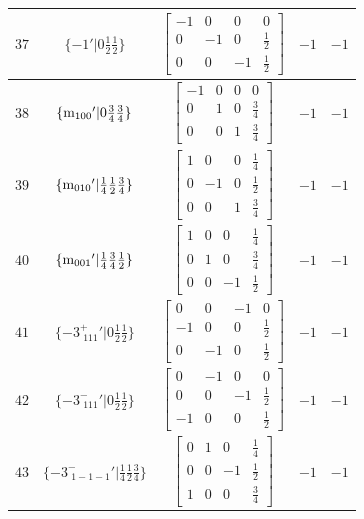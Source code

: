 \documentclass[fleqn,8pt]{jsarticle}
\begin{document}
\begin{longtable}{ccccc}
$ 37 $ & $ \{-1{}'|0 \frac{1}{2} \frac{1}{2}\} $ & $ \begin{bmatrix} -1 & 0 & 0 & 0 \\ 0 & -1 & 0 & \frac{1}{2} \\ 0 & 0 & -1 & \frac{1}{2} \end{bmatrix} $ & $ -1 $ & $ -1 $ \\ \hline
$ 38 $ & $ \{{\rm m}_{100}{}'|0 \frac{3}{4} \frac{3}{4}\} $ & $ \begin{bmatrix} -1 & 0 & 0 & 0 \\ 0 & 1 & 0 & \frac{3}{4} \\ 0 & 0 & 1 & \frac{3}{4} \end{bmatrix} $ & $ -1 $ & $ -1 $ \\ \hline
$ 39 $ & $ \{{\rm m}_{010}{}'|\frac{1}{4} \frac{1}{2} \frac{3}{4}\} $ & $ \begin{bmatrix} 1 & 0 & 0 & \frac{1}{4} \\ 0 & -1 & 0 & \frac{1}{2} \\ 0 & 0 & 1 & \frac{3}{4} \end{bmatrix} $ & $ -1 $ & $ -1 $ \\ \hline
$ 40 $ & $ \{{\rm m}_{001}{}'|\frac{1}{4} \frac{3}{4} \frac{1}{2}\} $ & $ \begin{bmatrix} 1 & 0 & 0 & \frac{1}{4} \\ 0 & 1 & 0 & \frac{3}{4} \\ 0 & 0 & -1 & \frac{1}{2} \end{bmatrix} $ & $ -1 $ & $ -1 $ \\ \hline
$ 41 $ & $ \{-3^{+}_{\,\,111}{}'|0 \frac{1}{2} \frac{1}{2}\} $ & $ \begin{bmatrix} 0 & 0 & -1 & 0 \\ -1 & 0 & 0 & \frac{1}{2} \\ 0 & -1 & 0 & \frac{1}{2} \end{bmatrix} $ & $ -1 $ & $ -1 $ \\ \hline
$ 42 $ & $ \{-3^{-}_{\,\,111}{}'|0 \frac{1}{2} \frac{1}{2}\} $ & $ \begin{bmatrix} 0 & -1 & 0 & 0 \\ 0 & 0 & -1 & \frac{1}{2} \\ -1 & 0 & 0 & \frac{1}{2} \end{bmatrix} $ & $ -1 $ & $ -1 $ \\ \hline
$ 43 $ & $ \{-3^{-}_{\,\,1-1-1}{}'|\frac{1}{4} \frac{1}{2} \frac{3}{4}\} $ & $ \begin{bmatrix} 0 & 1 & 0 & \frac{1}{4} \\ 0 & 0 & -1 & \frac{1}{2} \\ 1 & 0 & 0 & \frac{3}{4} \end{bmatrix} $ & $ -1 $ & $ -1 $ \\ \hline

\end{longtable}
\end{document}
